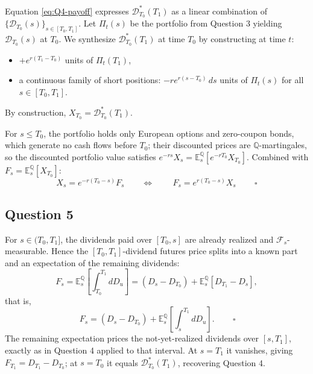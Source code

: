 \documentclass[12pt,a4paper]{article}
\begin{document}
Equation \eqref{eq:Q4-payoff} expresses $\mathcal{D}^*_{T_0}(T_1)$ as a linear combination of $\{\mathcal{D}_{T_0}(s)\}_{s \in [T_0, T_1]}$. Let $\Pi_t(s)$ be the portfolio from Question 3 yielding $\mathcal{D}_{T_0}(s)$ at $T_0$. We synthesize $\mathcal{D}^*_{T_0}(T_1)$ at time $T_0$ by constructing at time $t$:
\begin{itemize}
    \item $+ e^{r(T_1-T_0)}$ units of $\Pi_t(T_1)$,
    \item a continuous family of short positions: $- r e^{r(s-T_0)} \,ds$ units of $\Pi_t(s)$ for all $s \in [T_0, T_1]$.
\end{itemize}
By construction, $X_{T_0} = \mathcal{D}^*_{T_0}(T_1)$.

For $s \leq T_0$, the portfolio holds only European options and zero-coupon bonds, which generate no cash flows before $T_0$; their discounted prices are $\mathbb{Q}$-martingales, so the discounted portfolio value satisfies $e^{-rs}X_s = \mathbb{E}^\mathbb{Q}_s[e^{-rT_0}X_{T_0}]$. Combined with $F_s = \mathbb{E}^\mathbb{Q}_s[X_{T_0}]$:
\begin{equation*}
X_s = e^{-r(T_0-s)} F_s \qquad \Longleftrightarrow \qquad \boxed{\,F_s = e^{r(T_0-s)} X_s\,} \qquad \square
\end{equation*}

\subsection*{Question 5}

For $s \in (T_0, T_1]$, the dividends paid over $[T_0, s]$ are already realized and $\mathcal{F}_s$-measurable. Hence the $[T_0, T_1]$-dividend futures price splits into a known part and an expectation of the remaining dividends:
\begin{equation*}
F_s = \mathbb{E}^\mathbb{Q}_s\!\left[ \int_{T_0}^{T_1} dD_u \right] = (D_s - D_{T_0}) + \mathbb{E}^\mathbb{Q}_s\!\left[ D_{T_1} - D_s \right],
\end{equation*}
that is,
\begin{equation*}
\boxed{\,F_s = (D_s - D_{T_0}) + \mathbb{E}^\mathbb{Q}_s\!\left[\int_s^{T_1} dD_u\right].\,} \qquad \square
\end{equation*}
The remaining expectation prices the not-yet-realized dividends over $[s, T_1]$, exactly as in Question 4 applied to that interval. At $s = T_1$ it vanishes, giving $F_{T_1} = D_{T_1} - D_{T_0}$; at $s = T_0$ it equals $\mathcal{D}^*_{T_0}(T_1)$, recovering Question 4.
\end{document}
